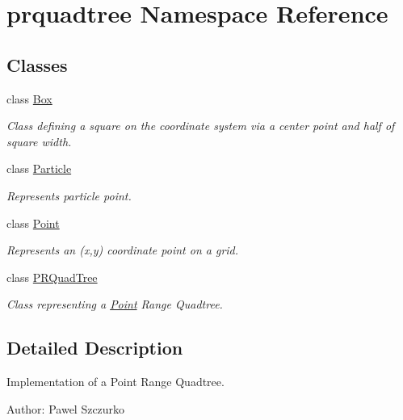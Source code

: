 \section{prquadtree Namespace Reference}
\label{namespaceprquadtree}
\subsection*{Classes}
\begin{DoxyCompactItemize}
\item 
class \hyperlink{classprquadtree_1_1Box}{Box}
\begin{DoxyCompactList}\small\item\em Class defining a square on the coordinate system via a center point and half of square width. \end{DoxyCompactList}\item 
class \hyperlink{classprquadtree_1_1Particle}{Particle}
\begin{DoxyCompactList}\small\item\em Represents particle point. \end{DoxyCompactList}\item 
class \hyperlink{classprquadtree_1_1Point}{Point}
\begin{DoxyCompactList}\small\item\em Represents an (x,y) coordinate point on a grid. \end{DoxyCompactList}\item 
class \hyperlink{classprquadtree_1_1PRQuadTree}{P\+R\+Quad\+Tree}
\begin{DoxyCompactList}\small\item\em Class representing a \hyperlink{classprquadtree_1_1Point}{Point} Range Quadtree. \end{DoxyCompactList}\end{DoxyCompactItemize}


\subsection{Detailed Description}
\begin{DoxyVerb}Implementation of a Point Range Quadtree.

Author: Pawel Szczurko
\end{DoxyVerb}
 